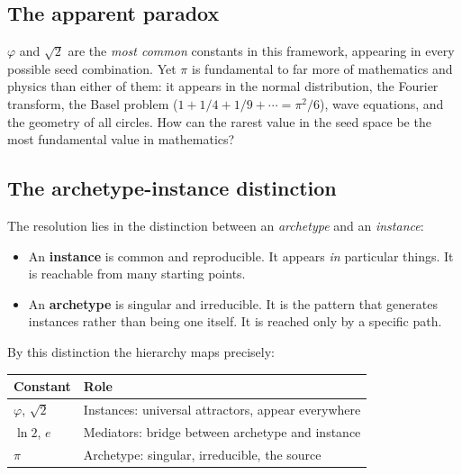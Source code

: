 \documentclass[12pt]{article}
\providecommand{\tightlist}{%
  \setlength{\itemsep}{0pt}\setlength{\parskip}{0pt}}
\begin{document}
\subsection{The apparent paradox}\label{the-apparent-paradox}

\(\varphi\) and \(\sqrt{2}\) are the \emph{most common} constants in
this framework, appearing in every possible seed combination. Yet
\(\pi\) is fundamental to far more of mathematics and physics than
either of them: it appears in the normal distribution, the Fourier
transform, the Basel problem (\(1 + 1/4 + 1/9 + \cdots = \pi^2/6\)),
wave equations, and the geometry of all circles. How can the rarest
value in the seed space be the most fundamental value in mathematics?

\subsection{The archetype-instance distinction}\label{the-archetype-instance-distinction}

The resolution lies in the distinction between an \emph{archetype} and
an \emph{instance}:

\begin{itemize}
\tightlist
\item
  An \textbf{instance} is common and reproducible. It appears \emph{in}
  particular things. It is reachable from many starting points.
\item
  An \textbf{archetype} is singular and irreducible. It is the pattern
  that generates instances rather than being one itself. It is reached
  only by a specific path.
\end{itemize}

By this distinction the hierarchy maps precisely:

\begin{longtable}[]{@{}
  >{\raggedright\arraybackslash}p{}
  >{\raggedright\arraybackslash}p{}@{}}
\toprule\noalign{}
\begin{minipage}[b]{\linewidth}\raggedright
Constant
\end{minipage} & \begin{minipage}[b]{\linewidth}\raggedright
Role
\end{minipage} \\
\midrule\noalign{}
\endhead
\bottomrule\noalign{}
\endlastfoot
\(\varphi\), \(\sqrt{2}\) & Instances: universal attractors, appear
everywhere \\
\(\ln 2\), \(e\) & Mediators: bridge between archetype and instance \\
\(\pi\) & Archetype: singular, irreducible, the source \\
\end{longtable}
\end{document}
